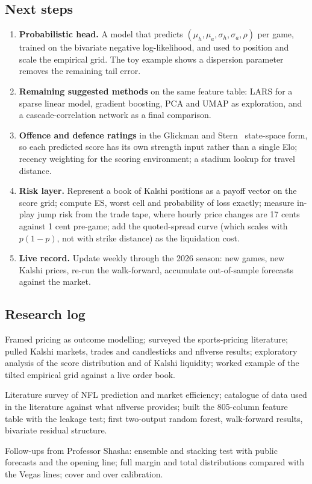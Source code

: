 \subsection{Next steps}
\begin{enumerate}[nosep]
\item \textbf{Probabilistic head.} A model that predicts $(\mu_h,\mu_a,\sigma_h,\sigma_a,\rho)$ per game, trained on the bivariate negative log-likelihood, and used to position and scale the empirical grid. The toy example shows a dispersion parameter removes the remaining tail error.
\item \textbf{Remaining suggested methods} on the same feature table: LARS for a sparse linear model, gradient boosting, PCA and UMAP as exploration, and a cascade-correlation network as a final comparison.
\item \textbf{Offence and defence ratings} in the Glickman and Stern~\cite{glickmanstern1998} state-space form, so each predicted score has its own strength input rather than a single Elo; recency weighting for the scoring environment; a stadium lookup for travel distance.
\item \textbf{Risk layer.} Represent a book of Kalshi positions as a payoff vector on the score grid; compute ES, worst cell and probability of loss exactly; measure in-play jump risk from the trade tape, where hourly price changes are 17 cents against 1 cent pre-game; add the quoted-spread curve (which scales with $p(1-p)$, not with strike distance) as the liquidation cost.
\item \textbf{Live record.} Update weekly through the 2026 season: new games, new Kalshi prices, re-run the walk-forward, accumulate out-of-sample forecasts against the market.
\end{enumerate}

\subsection{Research log}
\begin{description}[nosep,leftmargin=0pt,labelindent=0pt]
\item[30 September 2026] Framed pricing as outcome modelling; surveyed the sports-pricing literature; pulled Kalshi markets, trades and candlesticks and nflverse results; exploratory analysis of the score distribution and of Kalshi liquidity; worked example of the tilted empirical grid against a live order book.
\item[7 October 2026] Literature survey of NFL prediction and market efficiency; catalogue of data used in the literature against what nflverse provides; built the 805-column feature table with the leakage test; first two-output random forest, walk-forward results, bivariate residual structure.
\item[21 October 2026] Follow-ups from Professor Shasha: ensemble and stacking test with public forecasts and the opening line; full margin and total distributions compared with the Vegas lines; cover and over calibration.
\end{description}
